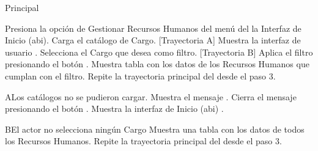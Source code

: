 \begin{UCtrayectoria}{Principal}

    \UCpaso[\UCactor] Presiona la opción de Gestionar Recursos Humanos del menú del la Interfaz de Inicio (abi).
    \UCpaso Carga el catálogo de Cargo. [Trayectoria A]
    \UCpaso Muestra la interfaz de usuario .
    \UCpaso[\UCactor] Selecciona el Cargo que desea como filtro. [Trayectoria B]
    \UCpaso[\UCactor] Aplica el filtro presionando el botón .
    \UCpaso Muestra tabla con los datos de los Recursos Humanos que cumplan con el filtro.
    \UCpaso Repite la trayectoria principal del  desde el paso 3.
\end{UCtrayectoria}


\begin{UCtrayectoriaA}{A}{Los catálogos no se pudieron cargar.}
    \UCpaso Muestra el mensaje .
    \UCpaso[\UCactor] Cierra el mensaje presionando el botón .
    \UCpaso Muestra la interfaz de Inicio (abi) .
\end{UCtrayectoriaA}


\begin{UCtrayectoriaA}{B}{El actor no selecciona ningún Cargo}
    \UCpaso Muestra una tabla con los datos de todos los Recursos Humanos.
    \UCpaso Repite la trayectoria principal del  desde el paso 3.
\end{UCtrayectoriaA}

